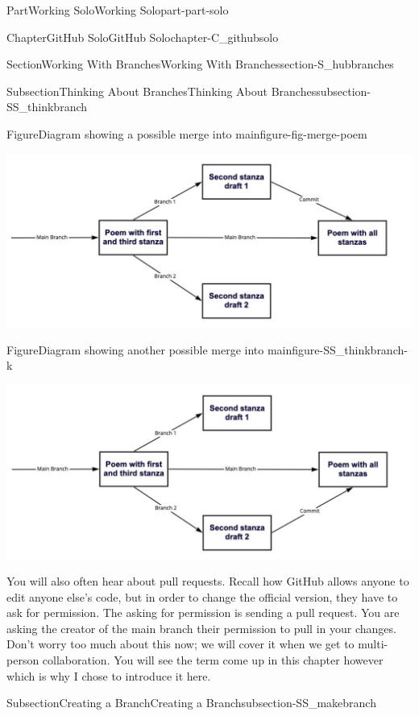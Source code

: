 \documentclass[oneside,10pt,]{book}
\begin{document}
\begin{partptx}{Part}{Working Solo}{}{Working Solo}{}{}{part-part-solo}
\begin{chapterptx}{Chapter}{GitHub Solo}{}{GitHub Solo}{}{}{chapter-C_githubsolo}
\begin{sectionptx}{Section}{Working With Branches}{}{Working With Branches}{}{}{section-S_hubbranches}
\begin{subsectionptx}{Subsection}{Thinking About Branches}{}{Thinking About Branches}{}{}{subsection-SS_thinkbranch}
\begin{figureptx}{Figure}{Diagram showing a possible merge into main}{figure-fig-merge-poem}{}
\begin{image}{0.05}{0.9}{0.05}{}
\includegraphics[width=\linewidth]{external/merge_poem1.pdf}
\end{image}%
\tcblower
\end{figureptx}%
\begin{figureptx}{Figure}{Diagram showing another possible merge into main}{figure-SS_thinkbranch-k}{}%
\begin{image}{0.05}{0.9}{0.05}{}%
\includegraphics[width=\linewidth]{external/merge_poem2.pdf}
\end{image}%
\tcblower
\end{figureptx}%
You will also often hear about pull requests. Recall how GitHub allows anyone to edit anyone else's code, but in order to change the official version, they have to ask for permission. The asking for permission is sending a pull request. You are asking the creator of the main branch their permission to pull in your changes. Don't worry too much about this now; we will cover it when we get to multi-person collaboration. You will see the term come up in this chapter however which is why I chose to introduce it here.%
\end{subsectionptx}
%
%
\typeout{************************************************}
\typeout{************************************************}
%
\begin{subsectionptx}{Subsection}{Creating a Branch}{}{Creating a Branch}{}{}{subsection-SS_makebranch}

\end{subsectionptx}
\end{sectionptx}
\end{chapterptx}
\end{partptx}
\end{document}
